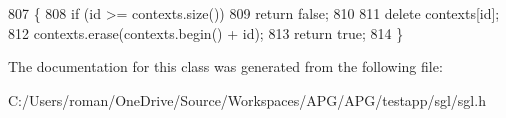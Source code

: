 \begin{DoxyCode}
807                                   \{
808         \textcolor{keywordflow}{if} (\textcolor{keywordtype}{id} >= contexts.size())
809             \textcolor{keywordflow}{return} \textcolor{keyword}{false};
810 
811         \textcolor{keyword}{delete} contexts[id];
812         contexts.erase(contexts.begin() + id);
813         \textcolor{keywordflow}{return} \textcolor{keyword}{true};
814     \}
\end{DoxyCode}


The documentation for this class was generated from the following file\+:\begin{DoxyCompactItemize}
\item 
C\+:/\+Users/roman/\+One\+Drive/\+Source/\+Workspaces/\+A\+P\+G/\+A\+P\+G/testapp/sgl/sgl.\+h\end{DoxyCompactItemize}
